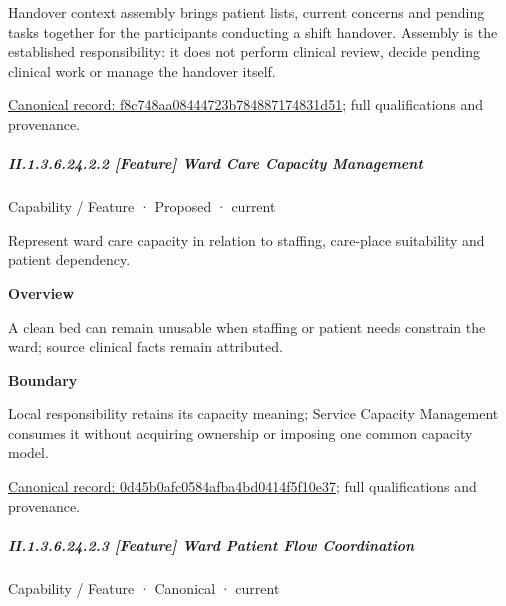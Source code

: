 Handover context assembly brings patient lists, current concerns and pending tasks together for the participants conducting a shift handover. Assembly is the established responsibility: it does not perform clinical review, decide pending clinical work or manage the handover itself.


{\footnotesize \href{../../../../../../../continuum/strategy/capability/feature/f8c748aa08444723b784887174831d51.md}{Canonical record: f8c748aa08444723b784887174831d51}; full qualifications and provenance.}\par
\subparagraph*{II.1.3.6.24.2.2 [Feature] Ward Care Capacity Management}
\label{navigation:II.1.3.6.24.2.2}

\label{element:0d45b0afc0584afba4bd0414f5f10e37}
{\small Capability / Feature · Proposed · current}\par

Represent ward care capacity in relation to staffing, care-place suitability and patient dependency.



\textbf{Overview}



A clean bed can remain unusable when staffing or patient needs constrain the ward; source clinical facts remain attributed.



\textbf{Boundary}



Local responsibility retains its capacity meaning; Service Capacity Management consumes it without acquiring ownership or imposing one common capacity model.


{\footnotesize \href{../../../../../../../continuum/strategy/capability/feature/0d45b0afc0584afba4bd0414f5f10e37.md}{Canonical record: 0d45b0afc0584afba4bd0414f5f10e37}; full qualifications and provenance.}\par
\subparagraph*{II.1.3.6.24.2.3 [Feature] Ward Patient Flow Coordination}
\label{navigation:II.1.3.6.24.2.3}

\label{element:011d8c6481264ff58b7866a2c74a235b}
{\small Capability / Feature · Canonical · current}\par

